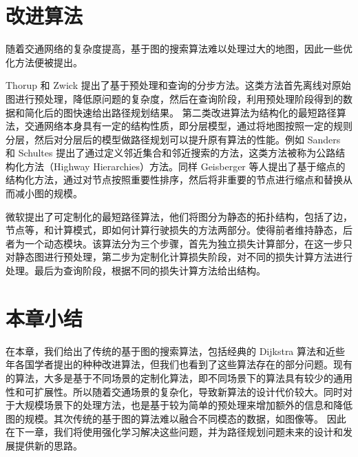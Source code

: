 \documentclass{standalone}
\begin{document}
\section{改进算法}
随着交通网络的复杂度提高，基于图的搜索算法难以处理过大的地图，因此一些优化方法便被提出。\par
Thorup 和 Zwick 提出了基于预处理和查询的分步方法。这类方法首先离线对原始图进行预处理，降低原问题的复杂度，然后在查询阶段，利用预处理阶段得到的数据和简化后的图快速给出路径规划结果。
第二类改进算法为结构化的最短路径算法，交通网络本身具有一定的结构性质，即分层模型，通过将地图按照一定的规则分层，然后对分层后的模型做路径规划可以提升原有算法的性能。例如 Sanders 和 Schultes 提出了通过定义邻近集合和邻近搜索的方法，这类方法被称为公路结构化方法（Highway Hierarchies）方法。同样 Geisberger 等人提出了基于缩点的结构化方法，通过对节点按照重要性排序，然后将非重要的节点进行缩点和替换从而减小图的规模。\par
微软提出了可定制化的最短路径算法，他们将图分为静态的拓扑结构，包括了边，节点等，和计算模式，即如何计算行驶损失的方法两部分。使得前者维持静态，后者为一个动态模块。该算法分为三个步骤，首先为独立损失计算部分，在这一步只对静态图进行预处理，第二步为定制化计算损失阶段，对不同的损失计算方法进行处理。最后为查询阶段，根据不同的损失计算方法给出结构。

\section{本章小结}
在本章，我们给出了传统的基于图的搜索算法，包括经典的 Dijkstra 算法和近些年各国学者提出的种种改进算法，但我们也看到了这些算法存在的部分问题。现有的算法，大多是基于不同场景的定制化算法，即不同场景下的算法具有较少的通用性和可扩展性。所以随着交通场景的复杂化，导致新算法的设计代价较大。同时对于大规模场景下的处理方法，也是基于较为简单的预处理来增加额外的信息和降低图的规模。其次传统的基于图的算法难以融合不同模态的数据，如图像等。
因此在下一章，我们将使用强化学习解决这些问题，并为路径规划问题未来的设计和发展提供新的思路。
\end{document}
